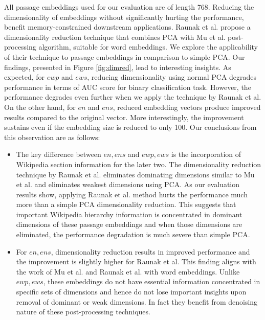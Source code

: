 All passage embeddings used for our evaluation are of length 768. Reducing the dimensionality of embeddings without significantly hurting the performance, benefit memory-constrained downstream applications. Raunak et al. \cite{raunak2019effective} propose a dimensionality reduction technique that combines PCA with Mu et al. post-processing algorithm, suitable for word embeddings. We explore the applicability of their technique to passage embeddings in comparison to simple PCA. Our findings, presented in Figure \ref{fig:dimred}, lead to interesting insights. As expected, for $ewp$ and $ews$, reducing dimensionality using normal PCA degrades performance in terms of AUC score for binary classification task. However, the performance degrades even further when we apply the technique by Raunak et al. On the other hand, for $en$ and $ens$, reduced embedding vectors produce improved results compared to the original vector. More interestingly, the improvement sustains even if the embedding size is reduced to only 100. Our conclusions from this observation are as follows:
\begin{itemize}[leftmargin=.15in]
    \item The key difference between $en, ens$ and $ewp, ews$ is the incorporation of Wikipedia section information for the later two. The dimensionality reduction technique by Raunak et al. eliminates dominating dimensions similar to Mu et al. and eliminates weakest dimensions using PCA. As our evaluation results show, applying Raunak et al. method hurts the performance much more than a simple PCA dimensionality reduction. This suggests that important Wikipedia hierarchy information is concentrated in dominant dimensions of these passage embeddings and when those dimensions are eliminated, the performance degradation is much severe than simple PCA.
    \item For $en, ens$, dimensionality reduction results in improved performance and the improvement is slightly higher for Raunak et al. This finding aligns with the work of Mu et al. and Raunak et al. with word embeddings. Unlike $ewp, ews$, these embeddings do not have essential information concentrated in specific sets of dimensions and hence do not lose important insights upon removal of dominant or weak dimensions. In fact they benefit from denoising nature of these post-processing techniques.
\end{itemize}

